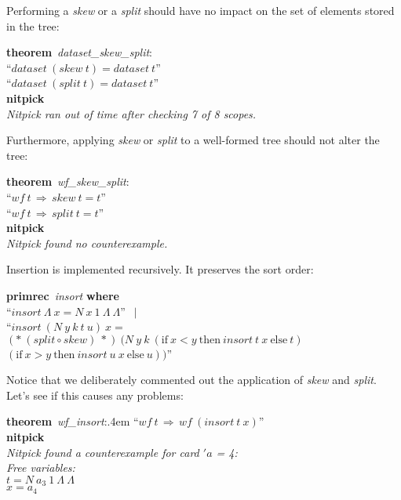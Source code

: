 \documentclass[a4paper,12pt]{article}
\begin{document}
Performing a \textit{skew} or a \textit{split} should have no impact on the set
of elements stored in the tree:

\prew
\textbf{theorem}~\textit{dataset\_skew\_split}:\\
``$\textit{dataset}~(\textit{skew}~t) = \textit{dataset}~t$'' \\
``$\textit{dataset}~(\textit{split}~t) = \textit{dataset}~t$'' \\
\textbf{nitpick} \\[2\smallskipamount]
{\slshape Nitpick ran out of time after checking 7 of 8 scopes.}
\postw

Furthermore, applying \textit{skew} or \textit{split} to a well-formed tree
should not alter the tree:

\prew
\textbf{theorem}~\textit{wf\_skew\_split}:\\
``$\textit{wf}~t\,\Longrightarrow\, \textit{skew}~t = t$'' \\
``$\textit{wf}~t\,\Longrightarrow\, \textit{split}~t = t$'' \\
\textbf{nitpick} \\[2\smallskipamount]
{\slshape Nitpick found no counterexample.}
\postw

Insertion is implemented recursively. It preserves the sort order:

\prew
\textbf{primrec}~\textit{insort} \textbf{where} \\
``$\textit{insort}~\Lambda~x = N~x~1~\Lambda~\Lambda$'' $\,\mid$ \\
``$\textit{insort}~(N~y~k~t~u)~x =$ \\
\phantom{``}$({*}~(\textit{split} \circ \textit{skew})~{*})~(N~y~k~(\textrm{if}~x < y~\textrm{then}~\textit{insort}~t~x~\textrm{else}~t)$ \\
$(\textrm{if}~x > y~\textrm{then}~\textit{insort}~u~x~\textrm{else}~u))$''
\postw

Notice that we deliberately commented out the application of \textit{skew} and
\textit{split}. Let's see if this causes any problems:

\prew
\textbf{theorem}~\textit{wf\_insort}:\kern.4em ``$\textit{wf}~t\,\Longrightarrow\, \textit{wf}~(\textit{insort}~t~x)$'' \\
\textbf{nitpick} \\[2\smallskipamount]
\slshape Nitpick found a counterexample for \textit{card} $'a$ = 4: \\[2\smallskipamount]
\hbox{}\qquad Free variables: \nopagebreak \\
\hbox{}\qquad\qquad $t = N~a_3~1~\Lambda~\Lambda$ \\
\hbox{}\qquad\qquad $x = a_4$ \\[2\smallskipamount]
\postw
\end{document}
